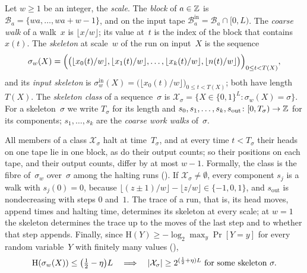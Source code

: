 \begin{definition}[Skeletons]\label{def:skeleton}
Let $w\ge1$ be an integer, the \emph{scale}. The \emph{block} of $a\in\mathbb{Z}$ is $\mathcal B_a=\{wa,\dots,wa+w-1\}$, and on
the input tape $\mathcal B^{\mathrm{in}}_a=\mathcal B_a\cap[0,L)$. The \emph{coarse walk} of a walk~$x$ is
$\lfloor x/w\rfloor$; its value at~$t$ is the index of the block that contains $x(t)$. The \emph{skeleton} at scale~$w$
of the run on input~$X$ is the sequence
\[
  \sigma_w(X)=\Bigl(\bigl(\lfloor x_0(t)/w\rfloor,\lfloor x_1(t)/w\rfloor,\dots,\lfloor x_k(t)/w\rfloor,
  \lfloor n(t)/w\rfloor\bigr)\Bigr)_{0\le t<T(X)},
\]
and its \emph{input skeleton} is $\sigma^{\mathrm{in}}_w(X)=\bigl(\lfloor x_0(t)/w\rfloor\bigr)_{0\le t<T(X)}$; both
have length $T(X)$. The \emph{skeleton class} of a sequence~$\sigma$ is
$\mathcal X_\sigma=\{X\in\{0,1\}^L:\sigma_w(X)=\sigma\}$. For a skeleton~$\sigma$ we write $T_\sigma$ for its length and
$s_0,s_1,\dots,s_k,s_{\mathrm{out}}\colon[0,T_\sigma)\to\mathbb{Z}$ for its components; $s_1,\dots,s_k$ are the \emph{coarse
work walks} of~$\sigma$.
\end{definition}

All members of a class $\mathcal X_\sigma$ halt at time~$T_\sigma$, and at every time $t<T_\sigma$ their heads on one
tape lie in one block, as do their output counts; so their positions on each tape, and their output counts, differ by at
most $w-1$. Formally, the class is the fibre of~$\sigma_w$ over~$\sigma$ among the halting runs
(). If $\mathcal X_\sigma\ne\emptyset$, every component $s_j$ is a walk with
$s_j(0)=0$, because $\lfloor(z\pm1)/w\rfloor-\lfloor z/w\rfloor\in\{-1,0,1\}$, and $s_{\mathrm{out}}$ is nondecreasing
with steps $0$ and~$1$. The trace of a run, that is, its head moves, append times and halting time, determines its
skeleton at every scale; at $w=1$ the skeleton determines the trace up to the moves of the last step and to whether that
step appends. Finally, since $\mathrm H(Y)\ge-\log_2\max_y\Pr[Y=y]$ for every random variable~$Y$ with finitely many
values (),
\begin{equation}\label{eq:skel-heavy}
  \mathrm H(\sigma_w(X))\le\bigl(\tfrac12-\eta\bigr)L\quad\Longrightarrow\quad
  \lvert \mathcal X_\sigma \rvert\ge2^{(\frac12+\eta)L}\ \text{for some skeleton }\sigma .
\end{equation}

